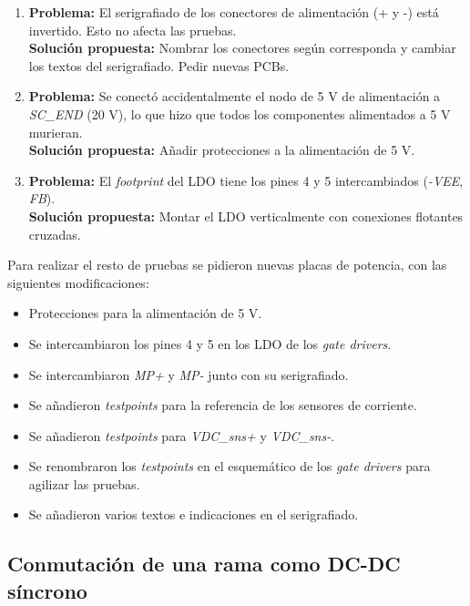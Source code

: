 \begin{enumerate}
	\item \textbf{Problema:} El serigrafiado de los conectores de alimentación (+ y -) está invertido. Esto no afecta las pruebas. \\
	\textbf{Solución propuesta:} Nombrar los conectores según corresponda y cambiar los textos del serigrafiado. Pedir nuevas PCBs.
	
	\item \textbf{Problema:} Se conectó accidentalmente el nodo de 5 V de alimentación a \textit{SC\_END} (20 V), lo  que hizo que todos los componentes alimentados a 5 V murieran.\\
	\textbf{Solución propuesta:} Añadir protecciones a la alimentación de 5 V.
	
	\item\textbf{Problema:} El \textit{footprint} del LDO tiene los pines 4 y 5 intercambiados (\textit{-VEE}, \textit{FB}). \\
	\textbf{Solución propuesta:} Montar el LDO verticalmente con conexiones flotantes cruzadas.
\end{enumerate}

Para realizar el resto de pruebas se pidieron nuevas placas de potencia, con las siguientes modificaciones:

\begin{itemize}
	\item Protecciones para la alimentación de 5 V.
	\item Se intercambiaron los pines 4 y 5 en los LDO de los \textit{gate drivers}.
	\item Se intercambiaron \textit{MP+} y \textit{MP-} junto con su serigrafiado.
	\item Se añadieron \textit{testpoints} para la referencia de los sensores de corriente.
	\item Se añadieron \textit{testpoints} para \textit{VDC\_sns+} y \textit{VDC\_sns-}.
	\item Se renombraron los \textit{testpoints} en el esquemático de los \textit{gate drivers} para agilizar las pruebas.
	\item Se añadieron varios textos e indicaciones en el serigrafiado.
\end{itemize}

\subsection{Conmutación de una rama como DC-DC síncrono}


